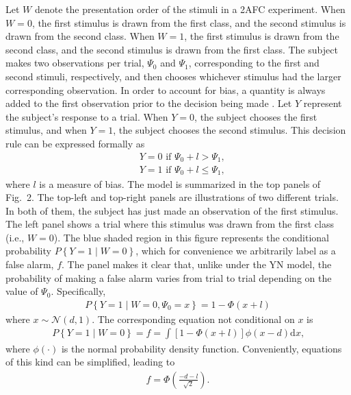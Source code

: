 \documentclass[man]{apa6}
\begin{document}
Let $W$ denote the presentation order of the stimuli in a 2AFC experiment. When $W=0$, the first stimulus is drawn from the first class, and the second stimulus is drawn from the second class. When $W=1$, the first stimulus is drawn from the second class, and the second stimulus is drawn from the first class. The subject makes two observations per trial, $\Psi_0$ and $\Psi_1$, corresponding to the first and second stimuli, respectively, and then chooses whichever stimulus had the larger corresponding observation. In order to account for bias, a quantity is always added to the first observation prior to the decision being made \parencite[see][]{decarloon2012}. Let $Y$ represent the subject's response to a trial. When $Y=0$, the subject chooses the first stimulus, and when $Y=1$, the subject chooses the second stimulus. This decision rule can be expressed formally as
\begin{eqnarray*}
&Y=0\textrm{ if }\Psi_0+l>\Psi_1\textrm{,}\\
&Y=1\textrm{ if }\Psi_0+l\le\Psi_1\textrm{,}
\end{eqnarray*}where $l$ is a measure of bias. The model is summarized in the top panels of Fig.~2. The top-left and top-right panels are illustrations of two different trials. In both of them, the subject has just made an observation of the first stimulus. The left panel shows a trial where this stimulus was drawn from the first class (i.e., $W=0$). The blue shaded region in this figure represents the conditional probability $P\left\{Y=1\mid{}W=0\right\}$, which for convenience we arbitrarily label as a false alarm, $f$. The panel makes it clear that, unlike under the YN model, the probability of making a false alarm varies from trial to trial depending on the value of $\Psi_0$. Specifically,
\begin{eqnarray*}
P\left\{Y=1\mid{}W=0,\Psi_0=x\right\}=1-\Phi\left(x+l\right)
\end{eqnarray*} where $x\sim\mathcal{N}\left(d,1\right)$. The corresponding equation not conditional on $x$ is
\begin{eqnarray*}
P\left\{Y=1\mid{}W=0\right\}=f=\int\!\left[1-\Phi\left(x+l\right)\right]\phi\left(x-d\right)\textrm{d}x\textrm{,}
\end{eqnarray*} where $\phi\left(\cdot\right)$ is the normal probability density function. Conveniently, equations of this kind can be simplified, leading to
\begin{eqnarray*}
f=\Phi\left(\frac{-d-l}{\sqrt{2}}\right)\textrm{.}
\end{eqnarray*}
\end{document}

